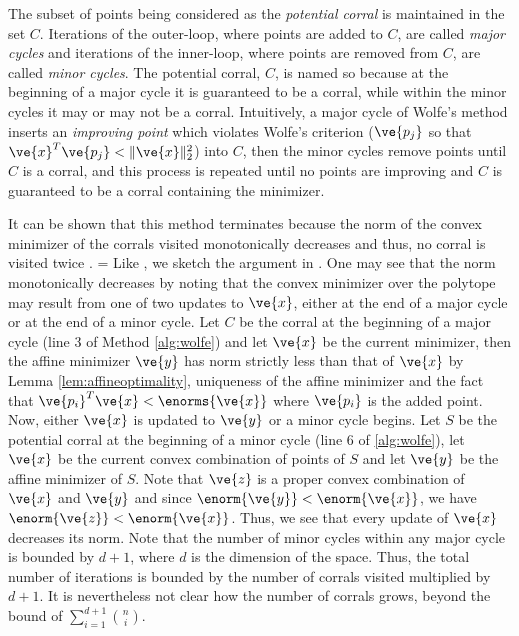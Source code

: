 
The subset of points being considered as the \emph{potential corral} is maintained in the set $C$.  Iterations of the outer-loop, where points are added to $C$, are called \emph{major cycles} and iterations of the inner-loop, where points are removed from $C$, are called \emph{minor cycles}.  
The potential corral, $C$, is named so because at the beginning of a major cycle it is guaranteed to be a corral, while within the minor cycles it may or may not be a corral.  
Intuitively, a major cycle of Wolfe's method inserts an \emph{improving point} 
which violates %
Wolfe's criterion ($\ve{p_j}$ so that $\ve{x}^T \ve{p_j} < \|\ve{x}\|_2^2$) into $C$, then the minor cycles remove points until $C$ is a corral, and this process is repeated until no points are improving and $C$ is guaranteed to be a corral containing the minimizer.

It can be shown that this method terminates because the norm of the convex minimizer of the corrals visited monotonically decreases and thus, no corral is visited twice \cite{wolfe}. 
\ifnum\version=\stocversion
\else
Like \cite{chakrabarty}, we sketch the argument in \cite{wolfe}.  
One may see that the norm monotonically decreases by noting that the convex minimizer over the polytope may result from one of two updates to $\ve{x}$, either at the end of a major cycle or at the end of a minor cycle.  
Let $C$ be the corral at the beginning of a major cycle (line 3 of Method \ref{alg:wolfe}) and let $\ve{x}$ be the current minimizer, then the affine minimizer $\ve{y}$ has norm strictly less than that of $\ve{x}$ by Lemma \ref{lem:affineoptimality}, uniqueness of the affine minimizer and the fact that $\ve{p_i}^T\ve{x} < \enorms{\ve{x}}$ where $\ve{p_i}$ is the added point.  
Now, either $\ve{x}$ is updated to $\ve{y}$ or a minor cycle begins.  
Let $S$ be the potential corral at the beginning of a minor cycle (line 6 of \ref{alg:wolfe}), let $\ve{x}$ be the current convex combination of points of $S$ and let $\ve{y}$ be the affine minimizer of $S$.  
Note that $\ve{z}$ is a proper convex combination of $\ve{x}$ and $\ve{y}$ and since $\enorm{\ve{y}} < \enorm{\ve{x}}$, we have $\enorm{\ve{z}} < \enorm{\ve{x}}$.  
Thus, we see that every update of $\ve{x}$ decreases its norm.  
Note that the number of minor cycles within any major cycle is bounded by $d+1$, where $d$ is the dimension of the space.  
Thus, the total number of iterations is bounded by the number of corrals visited multiplied by $d+1$.  
\fi
It is nevertheless not clear how the number of corrals grows, beyond the bound of $\sum_{i=1}^{d+1} \binom ni$.

